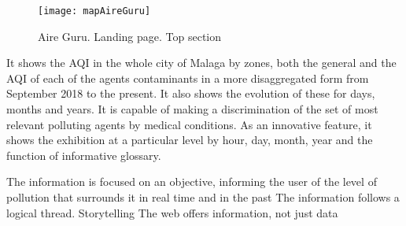 \newpage
\begin{figure}[ht]
    \centering
    \texttt{[image: mapAireGuru]}
    \caption{Aire Guru. Landing page. Top section}
\end{figure}

It shows the AQI in the whole city of Malaga by zones, both the general and the AQI of each of the agents
contaminants in a more disaggregated form from September 2018 to the present. It also shows the evolution
of these for days, months and years.
It is capable of making a discrimination of the set of most relevant polluting agents by medical conditions.
As an innovative feature, it shows the exhibition at a particular level by hour, day, month, year and the function of
informative glossary.


\begin{itemize}
\done The information is focused on an objective, informing the user of the level of pollution that surrounds it in real time
and in the past
\done The information follows a logical thread. Storytelling
\done The web offers information, not just data
\end{itemize}

\newpage